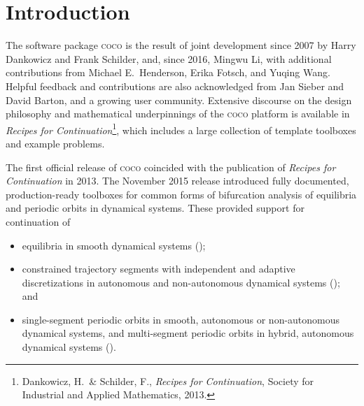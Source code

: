  

\section{Introduction}
The software package \textsc{coco} is the result of joint development since 2007 by Harry Dankowicz and Frank Schilder, and, since 2016, Mingwu Li, with additional contributions from Michael E.~Henderson, Erika Fotsch, and Yuqing Wang. Helpful feedback and contributions are also acknowledged from Jan Sieber and David Barton, and a growing user community. Extensive discourse on the design philosophy and mathematical underpinnings of the \textsc{coco} platform is available in \emph{Recipes for Continuation}\footnote{Dankowicz, H.~\& Schilder, F., \emph{Recipes for Continuation}, Society for Industrial and Applied Mathematics, 2013.}, which includes a large collection of template toolboxes and example problems.

The first official release of \textsc{coco} coincided with the publication of \emph{Recipes for Continuation} in 2013. The November 2015 release introduced fully documented, production-ready toolboxes for common forms of bifurcation analysis of equilibria and periodic orbits in dynamical systems. These provided support for continuation of
\begin{itemize}
\item equilibria in smooth dynamical systems ();
\item constrained trajectory segments with independent and adaptive discretizations in autonomous and non-autonomous dynamical systems (); and
\item single-segment periodic orbits in smooth, autonomous or non-autonomous dynamical systems, and multi-segment periodic orbits in hybrid, autonomous dynamical systems ().
\end{itemize} 

